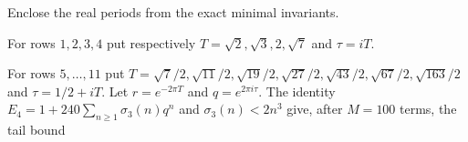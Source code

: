 \item Enclose the real periods from the exact minimal invariants.

For rows $1,2,3,4$
put respectively $T=\sqrt2,\sqrt3,2,\sqrt7$ and $\tau=iT$.

For rows $5,\ldots,11$ put
$T=\sqrt{7}/2,\sqrt{11}/2,\sqrt{19}/2,\sqrt{27}/2,
\sqrt{43}/2,\sqrt{67}/2,\sqrt{163}/2$ and $\tau=1/2+iT$.
Let $r=e^{-2\pi T}$ and $q=e^{2\pi i\tau}$.  The identity
$E_4=1+240\sum_{n\geq1}\sigma_3(n)q^n$ and
$\sigma_3(n)<2n^3$ give, after $M=100$ terms, the tail bound
